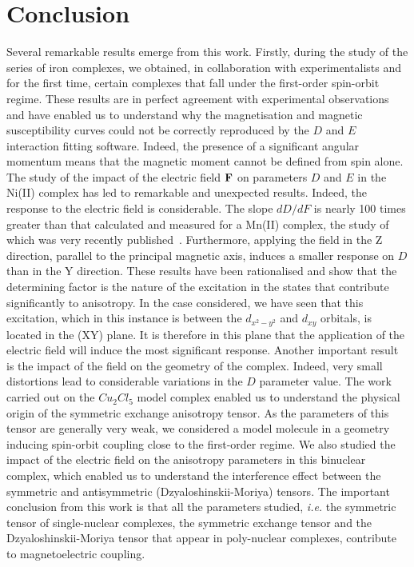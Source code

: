 \documentclass[12pt,a4paper]{report}
\numberwithin{equation}{section}
\begin{document}
\chapter*{Conclusion}

Several remarkable results emerge from this work. 
Firstly, during the study of the series of iron complexes, we obtained, in collaboration with experimentalists and for the first time, certain complexes that fall under the first-order spin-orbit regime.
These results are in perfect agreement with experimental observations and have enabled us to understand why the magnetisation and magnetic susceptibility curves could not be correctly reproduced by the $D$ and $E$ interaction fitting software.
Indeed, the presence of a significant angular momentum means that the magnetic moment cannot be defined from spin alone. 
The study of the impact of the electric field $\vb{F}$ on parameters $D$ and $E$ in the Ni(II) complex has led to remarkable and unexpected results.
Indeed, the response to the electric field is considerable.
The slope $dD/dF$ is nearly 100 times greater than that calculated and measured for a Mn(II) complex, the study of which was very recently published~\cite{vaganov_chemical_2025}.
Furthermore, applying the field in the Z direction, parallel to the principal magnetic axis, induces a smaller response on $D$ than in the Y direction.
These results have been rationalised and show that the determining factor is the nature of the excitation in the states that contribute significantly to anisotropy.
In the case considered, we have seen that this excitation, which in this instance is between the $d_{x^2-y^2}$ and $d_{xy}$ orbitals, is located in the (XY) plane.
It is therefore in this plane that the application of the electric field will induce the most significant response.
Another important result is the impact of the field on the geometry of the complex.
Indeed, very small distortions lead to considerable variations in the $D$ parameter value. 
The work carried out on the $Cu_2Cl_5$ model complex enabled us to understand the physical origin of the symmetric exchange anisotropy tensor.
As the parameters of this tensor are generally very weak, we considered a model molecule in a geometry inducing spin-orbit coupling close to the first-order regime.
We also studied the impact of the electric field on the anisotropy parameters in this binuclear complex, which enabled us to understand the interference effect between the symmetric and antisymmetric (Dzyaloshinskii-Moriya) tensors. 
The important conclusion from this work is that all the parameters studied, \textit{i.e.} the symmetric tensor of single-nuclear complexes, the symmetric exchange tensor and the Dzyaloshinskii-Moriya tensor that appear in poly-nuclear complexes, contribute to magnetoelectric coupling.
\end{document}
